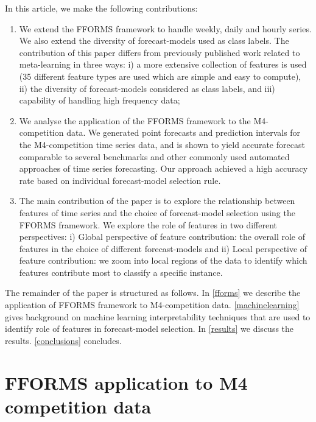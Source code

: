 \documentclass[11pt,a4paper,]{article}
\providecommand{\tightlist}{%
  \setlength{\itemsep}{0pt}\setlength{\parskip}{0pt}}
\begin{document}
In this article, we make the following contributions:

\begin{enumerate}
\def\labelenumi{\arabic{enumi}.}
\tightlist
\item
  We extend the FFORMS framework to handle weekly, daily and hourly
  series. We also extend the diversity of forecast-models used as class
  labels. The contribution of this paper differs from previously
  published work related to meta-learning
  \autocites{prudencio2004meta}{lemke2010meta}{kuck2016meta} in three
  ways: i) a more extensive collection of features is used (35 different
  feature types are used which are simple and easy to compute), ii) the
  diversity of forecast-models considered as class labels, and iii)
  capability of handling high frequency data;
\item
  We analyse the application of the FFORMS framework to the
  M4-competition data. We generated point forecasts and prediction
  intervals for the M4-competition time series data, and is shown to
  yield accurate forecast comparable to several benchmarks and other
  commonly used automated approaches of time series forecasting. Our
  approach achieved a high accuracy rate based on individual
  forecast-model selection rule.
\item
  The main contribution of the paper is to explore the relationship
  between features of time series and the choice of forecast-model
  selection using the FFORMS framework. We explore the role of features
  in two different perspectives: i) Global perspective of feature
  contribution: the overall role of features in the choice of different
  forecast-models and ii) Local perspective of feature contribution: we
  zoom into local regions of the data to identify which features
  contribute most to classify a specific instance.
\end{enumerate}

The remainder of the paper is structured as follows. In \autoref{fforms}
we describe the application of FFORMS framework to M4-competition data.
\autoref{machinelearning} gives background on machine learning
interpretability techniques that are used to identify role of features
in forecast-model selection. In \autoref{results} we discuss the
results. \autoref{conclusions} concludes.

\section{FFORMS application to M4 competition data}\label{fforms}
\end{document}
